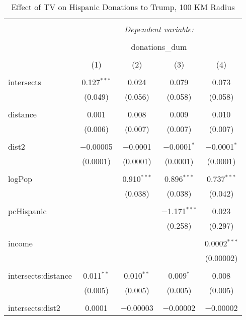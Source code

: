 
\begin{table}[!htbp] \centering 
  \caption{Effect of TV on Hispanic Donations to Trump, 100 KM Radius} 
  \label{} 
\begin{tabular}{@{\extracolsep{-5pt}}lcccc} 
\\[-1.8ex]\hline 
\hline \\[-1.8ex] 
 & \multicolumn{4}{c}{\textit{Dependent variable:}} \\ 
\cline{2-5} 
\\[-1.8ex] & \multicolumn{4}{c}{donations\_dum} \\ 
\\[-1.8ex] & (1) & (2) & (3) & (4)\\ 
\hline \\[-1.8ex] 
 intersects & 0.127$^{***}$ & 0.024 & 0.079 & 0.073 \\ 
  & (0.049) & (0.056) & (0.058) & (0.058) \\ 
  & & & & \\ 
 distance & 0.001 & 0.008 & 0.009 & 0.010 \\ 
  & (0.006) & (0.007) & (0.007) & (0.007) \\ 
  & & & & \\ 
 dist2 & $-$0.00005 & $-$0.0001 & $-$0.0001$^{*}$ & $-$0.0001$^{*}$ \\ 
  & (0.0001) & (0.0001) & (0.0001) & (0.0001) \\ 
  & & & & \\ 
 logPop &  & 0.910$^{***}$ & 0.896$^{***}$ & 0.737$^{***}$ \\ 
  &  & (0.038) & (0.038) & (0.042) \\ 
  & & & & \\ 
 pcHispanic &  &  & $-$1.171$^{***}$ & 0.023 \\ 
  &  &  & (0.258) & (0.297) \\ 
  & & & & \\ 
 income &  &  &  & 0.0002$^{***}$ \\ 
  &  &  &  & (0.00002) \\ 
  & & & & \\ 
 intersects:distance & 0.011$^{**}$ & 0.010$^{**}$ & 0.009$^{*}$ & 0.008 \\ 
  & (0.005) & (0.005) & (0.005) & (0.005) \\ 
  & & & & \\ 
 intersects:dist2 & 0.0001 & $-$0.00003 & $-$0.00002 & $-$0.00002 \\ 

\end{tabular}
\end{table}
